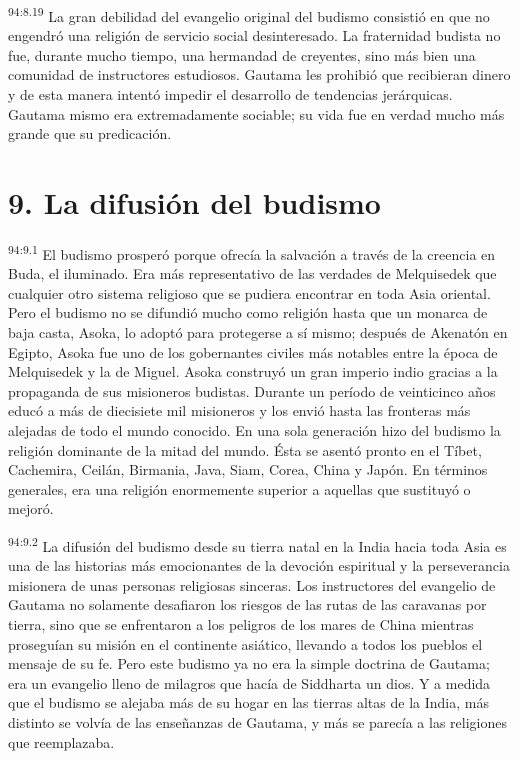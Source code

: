 \par
\textsuperscript{94:8.19} La gran debilidad del evangelio original del budismo consistió en que no engendró una religión de servicio social desinteresado. La fraternidad budista no fue, durante mucho tiempo, una hermandad de creyentes, sino más bien una comunidad de instructores estudiosos. Gautama les prohibió que recibieran dinero y de esta manera intentó impedir el desarrollo de tendencias jerárquicas. Gautama mismo era extremadamente sociable; su vida fue en verdad mucho más grande que su predicación.

\section*{9. La difusión del budismo}
\par
\textsuperscript{94:9.1} El budismo prosperó porque ofrecía la salvación a través de la creencia en Buda, el iluminado. Era más representativo de las verdades de Melquisedek que cualquier otro sistema religioso que se pudiera encontrar en toda Asia oriental. Pero el budismo no se difundió mucho como religión hasta que un monarca de baja casta, Asoka, lo adoptó para protegerse a sí mismo; después de Akenatón en Egipto, Asoka fue uno de los gobernantes civiles más notables entre la época de Melquisedek y la de Miguel. Asoka construyó un gran imperio indio gracias a la propaganda de sus misioneros budistas. Durante un período de veinticinco años educó a más de diecisiete mil misioneros y los envió hasta las fronteras más alejadas de todo el mundo conocido. En una sola generación hizo del budismo la religión dominante de la mitad del mundo. Ésta se asentó pronto en el Tíbet, Cachemira, Ceilán, Birmania, Java, Siam, Corea, China y Japón. En términos generales, era una religión enormemente superior a aquellas que sustituyó o mejoró.

\par
\textsuperscript{94:9.2} La difusión del budismo desde su tierra natal en la India hacia toda Asia es una de las historias más emocionantes de la devoción espiritual y la perseverancia misionera de unas personas religiosas sinceras. Los instructores del evangelio de Gautama no solamente desafiaron los riesgos de las rutas de las caravanas por tierra, sino que se enfrentaron a los peligros de los mares de China mientras proseguían su misión en el continente asiático, llevando a todos los pueblos el mensaje de su fe. Pero este budismo ya no era la simple doctrina de Gautama; era un evangelio lleno de milagros que hacía de Siddharta un dios. Y a medida que el budismo se alejaba más de su hogar en las tierras altas de la India, más distinto se volvía de las enseñanzas de Gautama, y más se parecía a las religiones que reemplazaba.

